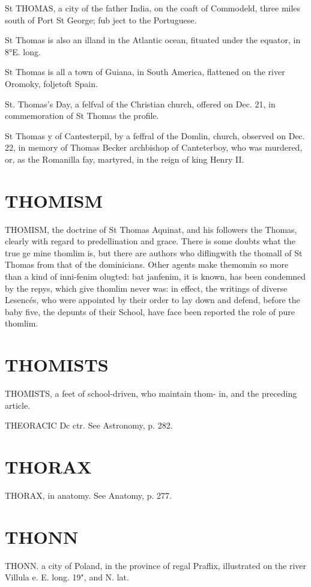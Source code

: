 \documentclass{article}
\begin{document}
St THOMAS, a city of the father India, on the coaft of Commodeld, three miles south of Port St George; fub ject to the Portuguese.

St Thomas is also an illand in the Atlantic ocean, fituated under the equator, in 8°E. long.

St Thomas is all a town of Guiana, in South America, flattened on the river Oromoky, foljetoft Spain.

St. Thomas’s Day, a felfval of the Christian church, offered on Dec. 21, in commemoration of St Thomas the profile.

St Thomas y of Cantesterpil, by a feffral of the Domlin, church, observed on Dec. 22, in memory of Thomas Becker archbishop of Canteterboy, who was murdered, or, as the Romanilla fay, martyred, in the reign of king Henry II.

\section*{THOMISM}
THOMISM, the doctrine of St Thomas Aquinat, and his followers the Thomas, clearly with regard to predellination and grace. There is some doubts what the true ge mine thomlim is, but there are authors who diflingwith the thomall of St Thomas from that of the dominicians. Other agents make themomin so more than a kind of inni-fenim olugted: bat janfenim, it is known, has been condemned by the repys, which give thomlim never was: in effect, the writings of diverse Lesencés, who were appointed by their order to lay down and defend, before the baby five, the depunts of their School, have face been reported the role of pure thomlim.

\section*{THOMISTS}
THOMISTS, a feet of school-driven, who maintain thom- in, and the preceding article.

THEORACIC Dc ctr. See Astronomy, p. 282.

\section*{THORAX}
THORAX, in anatomy. See Anatomy, p. 277.

\section*{THONN}
THONN. a city of Poland, in the province of regal Praflix, illustrated on the river Villula e. E. long. 19", and N. lat.
\end{document}
